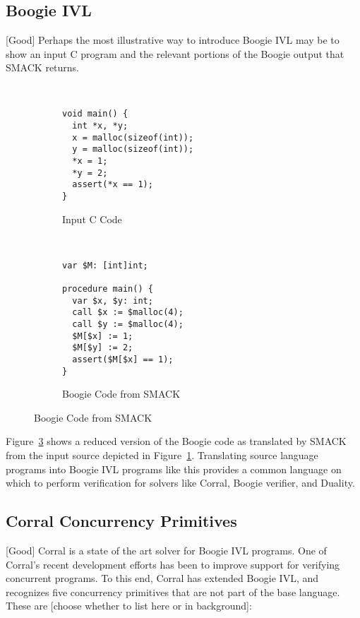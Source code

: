 \subsection{Boogie IVL}
[Good]
Perhaps the most illustrative way to introduce Boogie IVL may be to
show an input C program and the relevant portions of the Boogie output
that SMACK returns.
\begin{figure}[h]
\centering
\caption{SMACK Translation of C Program}\label{fig:cToBoogie}
\begin{subfigure}[b]{.45\textwidth}
\centering
\caption{Input C Code}\label{fig:cToBoogie_a}
\begin{lstlisting}


void main() {
  int *x, *y;
  x = malloc(sizeof(int));
  y = malloc(sizeof(int));
  *x = 1;
  *y = 2;
  assert(*x == 1);
}
\end{lstlisting}
\end{subfigure}
~
\begin{subfigure}[b]{.45\textwidth}
\centering
\caption{Boogie Code from SMACK}\label{fig:cToBoogie_b}
\begin{lstlisting}[language=boogie]
var $M: [int]int;

procedure main() {
  var $x, $y: int;
  call $x := $malloc(4);
  call $y := $malloc(4);
  $M[$x] := 1;
  $M[$y] := 2;
  assert($M[$x] == 1);
}
\end{lstlisting}
\end{subfigure}
\end{figure}

Figure~\ref{fig:cToBoogie_b} shows a reduced version of the Boogie
code as translated by SMACK from the input source depicted in
Figure~\ref{fig:cToBoogie_a}.  Translating source language programs
into Boogie IVL programs like this provides a common language on which
to perform verification for solvers like Corral, Boogie verifier, and
Duality.  

\subsection{Corral Concurrency Primitives}
[Good]
Corral is a state of the art solver for Boogie IVL programs.  One of
Corral's recent development efforts has been to improve support for
verifying concurrent programs.  To this end, Corral has extended
Boogie IVL, and recognizes five concurrency primitives that are not
part of the base language.  These are [choose whether to list here or
in background]: 

